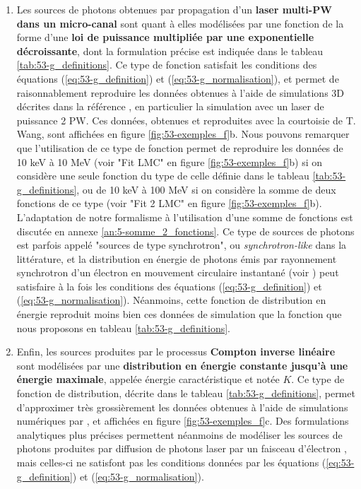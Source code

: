 \begin{refsection}
\begin{enumerate}[label=\roman*. ]
    \item Les sources de photons obtenues par propagation d'un \textbf{laser multi-PW dans un micro-canal} sont quant à elles modélisées par une fonction de la forme d'une \textbf{loi de puissance multipliée par une exponentielle décroissante}, dont la formulation précise est indiquée dans le tableau \ref{tab:53-g_definitions}. Ce type de fonction satisfait les conditions des équations (\ref{eq:53-g_definition}) et (\ref{eq:53-g_normalisation}), et permet de raisonnablement reproduire les données obtenues à l'aide de simulations 3D décrites dans la référence \cite{wang_2020}, en particulier la simulation avec un laser de puissance 2 PW. Ces données, obtenues et reproduites avec la courtoisie de T. Wang, sont affichées en figure \ref{fig:53-exemples_f}b. Nous pouvons remarquer que l'utilisation de ce type de fonction permet de reproduire les données de 10 keV à 10 MeV (voir "Fit LMC" en figure \ref{fig:53-exemples_f}b) si on considère une seule fonction du type de celle définie dans le tableau \ref{tab:53-g_definitions}, ou de 10 keV à 100 MeV si on considère la somme de deux fonctions de ce type (voir "Fit 2 LMC" en figure \ref{fig:53-exemples_f}b). L'adaptation de notre formalisme à l'utilisation d'une somme de fonctions est discutée en annexe \ref{an:5-somme_2_fonctions}. Ce type de sources de photons est parfois appelé "sources de type synchrotron", ou \textit{synchrotron-like} dans la littérature, et la distribution en énergie de photons émis par rayonnement synchrotron d'un électron en mouvement circulaire instantané (voir \parencite{jackson_2009}) peut satisfaire à la fois les conditions des équations (\ref{eq:53-g_definition}) et (\ref{eq:53-g_normalisation}). Néanmoins, cette fonction de distribution en énergie reproduit moins bien ces données de simulation que la fonction que nous proposons en tableau \ref{tab:53-g_definitions}.
    
    \item Enfin, les sources produites par le processus \textbf{Compton inverse linéaire} sont modélisées par une \textbf{distribution en énergie constante jusqu'à une énergie maximale}, appelée énergie caractéristique et notée $K$. Ce type de fonction de distribution, décrite dans le tableau \ref{tab:53-g_definitions}, permet d'approximer très grossièrement les données obtenues à l'aide de simulations numériques par \cite{drebot_2017a}, et affichées en figure \ref{fig:53-exemples_f}c. Des formulations analytiques plus précises permettent néanmoins de modéliser les sources de photons produites par diffusion de photons laser par un faisceau d'électron \parencite{fargion_1997}, mais celles-ci ne satisfont pas les conditions données par les équations (\ref{eq:53-g_definition}) et (\ref{eq:53-g_normalisation}).
\end{enumerate}


\end{refsection}

